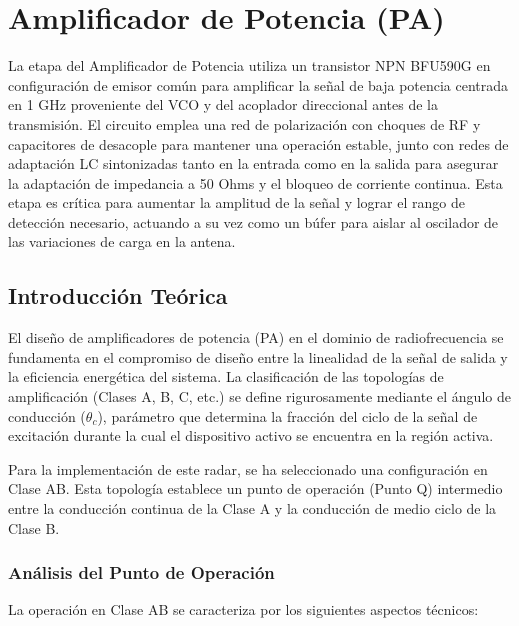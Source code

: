\chapter{Amplificador de Potencia (PA)}
\label{chap:pa}

La etapa del Amplificador de Potencia utiliza un transistor NPN BFU590G en configuración de emisor común para amplificar la señal de baja potencia centrada en 1 GHz proveniente del VCO y del acoplador direccional antes de la transmisión. El circuito emplea una red de polarización con choques de RF y capacitores de desacople para mantener una operación estable, junto con redes de adaptación LC sintonizadas tanto en la entrada como en la salida para asegurar la adaptación de impedancia a 50 Ohms y el bloqueo de corriente continua. Esta etapa es crítica para aumentar la amplitud de la señal y lograr el rango de detección necesario, actuando a su vez como un búfer para aislar al oscilador de las variaciones de carga en la antena.

\section{Introducción Teórica}

El diseño de amplificadores de potencia (PA) en el dominio de radiofrecuencia se fundamenta en el compromiso de diseño entre la linealidad de la señal de salida y la eficiencia energética del sistema. La clasificación de las topologías de amplificación (Clases A, B, C, etc.) se define rigurosamente mediante el ángulo de conducción ($\theta_c$), parámetro que determina la fracción del ciclo de la señal de excitación durante la cual el dispositivo activo se encuentra en la región activa.

Para la implementación de este radar, se ha seleccionado una configuración en Clase AB. Esta topología establece un punto de operación (Punto Q) intermedio entre la conducción continua de la Clase A y la conducción de medio ciclo de la Clase B.

\subsection{Análisis del Punto de Operación}

La operación en Clase AB se caracteriza por los siguientes aspectos técnicos:

